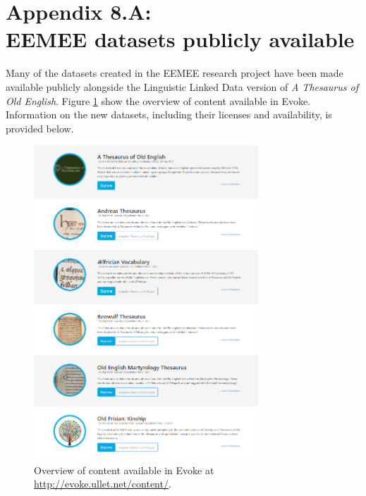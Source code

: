 %
%
%





\newpage
\section*{Appendix 8.A:\\EEMEE datasets publicly available}
\label{Appendix8.A}

\begingroup
\renewcommand{\thefigure}{8.A.\arabic{figure}}
\setcounter{figure}{0}
\renewcommand{\thetable}{8.A.\arabic{table}}
\setcounter{table}{0}

Many of the datasets created in the EEMEE research project have been made available publicly alongside the Linguistic Linked Data version of \textit{A Thesaurus of Old English}. Figure \ref{fig:Stolk2021x:Evoke-content} show the overview of content available in Evoke. Information on the new datasets, including their licenses and availability, is provided below. 

\begin{figure}[htbp]
    \centering
    \captionsetup{justification=centering,margin=2cm}
    \includegraphics[width=0.75\textwidth]{Stolk2021x/fig/Evoke-content-short.png}
	\caption[]{\label{fig:Stolk2021x:Evoke-content}Overview of content available in Evoke at\\\url{http://evoke.ullet.net/content/}.}
\end{figure}

